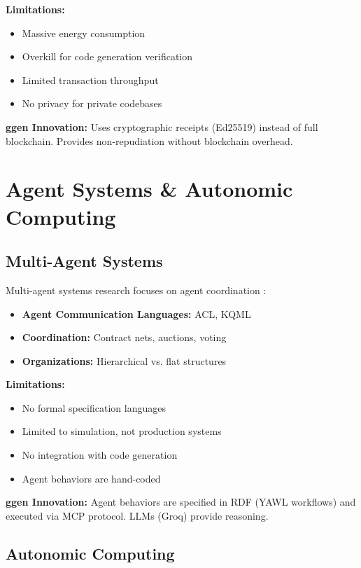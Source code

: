 \textbf{Limitations:}
\begin{itemize}
    \item Massive energy consumption
    \item Overkill for code generation verification
    \item Limited transaction throughput
    \item No privacy for private codebases
\end{itemize}

\textbf{ggen Innovation:} Uses cryptographic receipts (Ed25519) instead of full blockchain. Provides non-repudiation without blockchain overhead.

\section{Agent Systems \& Autonomic Computing}

\subsection{Multi-Agent Systems}

Multi-agent systems research focuses on agent coordination \cite{wooldridge1995multiagent, weiss1999multiagent}:

\begin{itemize}
    \item \textbf{Agent Communication Languages:} ACL, KQML
    \item \textbf{Coordination:} Contract nets, auctions, voting
    \item \textbf{Organizations:} Hierarchical vs. flat structures
\end{itemize}

\textbf{Limitations:}
\begin{itemize}
    \item No formal specification languages
    \item Limited to simulation, not production systems
    \item No integration with code generation
    \item Agent behaviors are hand-coded
\end{itemize}

\textbf{ggen Innovation:} Agent behaviors are specified in RDF (YAWL workflows) and executed via MCP protocol. LLMs (Groq) provide reasoning.

\subsection{Autonomic Computing}

